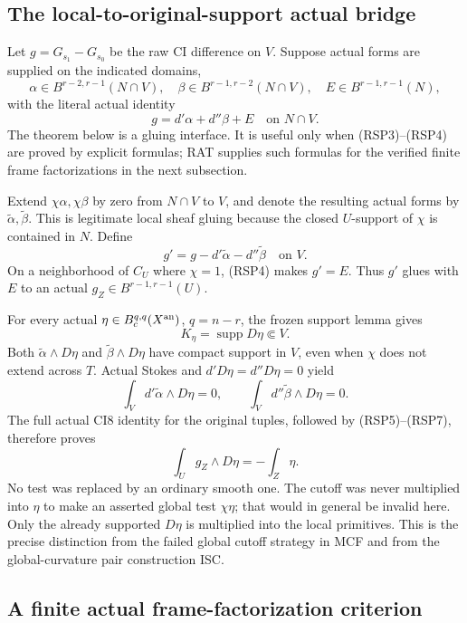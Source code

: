 \subsection{The local-to-original-support actual bridge}

Let $g=G_{s_1}-G_{s_0}$ be the raw CI difference on $V$.
Suppose actual forms are supplied on the indicated
domains,
\[
 \alpha\in B^{r-2,r-1}(N\cap V),\quad
 \beta\in B^{r-1,r-2}(N\cap V),\quad
                   E\in B^{r-1,r-1}(N),
 \tag{RSP3}
\]
with the literal actual identity
\[
                   g=d'\alpha+d''\beta+E
                                         \quad\text{on }N\cap V.
 \tag{RSP4}
\]
The theorem below is a gluing interface.  It is useful
only when (RSP3)--(RSP4) are proved by explicit formulas;
RAT supplies such formulas for the verified finite
frame factorizations in the next subsection.

Extend $\chi\alpha,\chi\beta$ by zero from $N\cap V$
to $V$, and denote the resulting actual forms by
$\widetilde\alpha,\widetilde\beta$.  This is legitimate
local sheaf gluing because the closed $U$-support of
$\chi$ is contained in $N$.  Define
\[
                    g'=g-d'\widetilde\alpha-d''\widetilde\beta
                                                    \quad\text{on }V.
 \tag{RSP5}
\]
On a neighborhood of $C_U$ where $\chi=1$, (RSP4)
makes $g'=E$.  Thus $g'$ glues with $E$ to an actual
$g_Z\in B^{r-1,r-1}(U)$.

For every actual $\eta\in B_c^{q,q}(X^{\rm an})$,
$q=n-r$, the frozen support lemma gives
\[
                         K_\eta=\operatorname{supp}D\eta\Subset V.
 \tag{RSP6}
\]
Both $\widetilde\alpha\wedge D\eta$ and
$\widetilde\beta\wedge D\eta$ have compact support
in $V$, even when $\chi$ does not extend across $T$.
Actual Stokes and $d'D\eta=d''D\eta=0$ yield
\[
 \int_Vd'\widetilde\alpha\wedge D\eta=0,
                   \qquad
 \int_Vd''\widetilde\beta\wedge D\eta=0.
 \tag{RSP7}
\]
The full actual CI8 identity for the original tuples,
followed by (RSP5)--(RSP7), therefore proves
\[
                         \int_Ug_Z\wedge D\eta=-\int_Z\eta.
 \tag{RSP8}
\]
No test was replaced by an ordinary smooth one.  The
cutoff was never multiplied into $\eta$ to make an
asserted global test $\chi\eta$; that would in general
be invalid here.  Only the already supported $D\eta$
is multiplied into the local primitives.  This is
the precise distinction from the failed global
cutoff strategy in MCF and from the global-curvature
pair construction ISC.

\subsection{A finite actual frame-factorization criterion}


